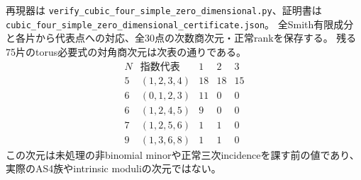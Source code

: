 再現器は
\texttt{verify\_cubic\_four\_simple\_zero\_dimensional.py}、証明書は\\
\texttt{cubic\_four\_simple\_zero\_dimensional\_certificate.json}。
全Smith有限成分と各片から代表点への対応、全30点の次数商次元・正常rankを保存する。
残る75片のtorus必要式の対角商次元は次表の通りである。
\[
\begin{array}{c|c|rrr}
N&\text{指数代表}&1&2&3\\\hline
5&(1,2,3,4)&18&18&15\\
6&(0,1,2,3)&11&0&0\\
6&(1,2,4,5)&9&0&0\\
7&(1,2,5,6)&1&1&0\\
9&(1,3,6,8)&1&1&0
\end{array}
\]
この次元は未処理の非binomial minorや正常三次incidenceを課す前の値であり、
実際のAS4族やintrinsic moduliの次元ではない。
